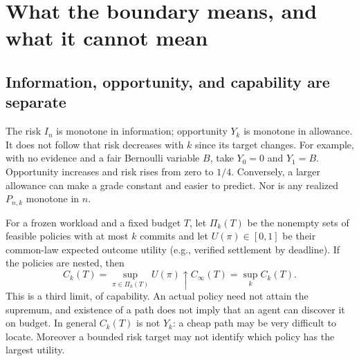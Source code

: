 \documentclass[11pt]{article}
\begin{document}
\section{What the boundary means, and what it cannot mean}
\subsection{Information, opportunity, and capability are separate}
The risk $I_n$ is monotone in information; opportunity $Y_k$ is monotone in allowance. It does not follow that risk decreases with $k$ since its target changes. For example, with no evidence and a fair Bernoulli variable $B$, take $Y_0=0$ and $Y_1=B$. Opportunity increases and risk rises from zero to $1/4$. Conversely, a larger allowance can make a grade constant and easier to predict. Nor is any realized $P_{n,k}$ monotone in $n$.

For a frozen workload and a fixed budget $T$, let $\Pi_k(T)$ be the nonempty sets of feasible policies with at most $k$ commits and let $U(\pi)\in[0,1]$ be their common-law expected outcome utility (e.g., verified settlement by deadline). If the policies are nested, then
\[C_k(T)=\sup_{\pi\in\Pi_k(T)}U(\pi)\uparrow C_\infty(T)=\sup_k C_k(T).\]
This is a third limit, of capability. An actual policy need not attain the supremum, and existence of a path does not imply that an agent can discover it on budget. In general $C_k(T)$ is not $Y_k$: a cheap path may be very difficult to locate. Moreover a bounded risk target may not identify which policy has the largest utility.
\end{document}
